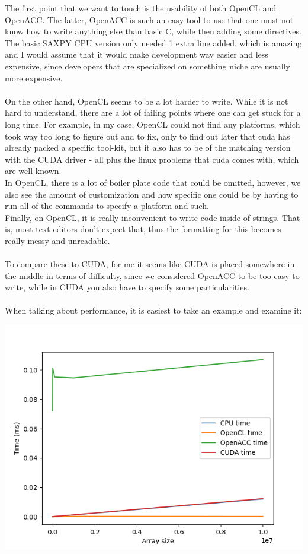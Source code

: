 \documentclass[english]{exam}
\begin{document}
{The first point that we want to touch is the usability of both OpenCL and OpenACC. The latter, OpenACC is such an easy tool to use that one must not know how to write anything else than basic C, while then adding some directives. The basic SAXPY CPU version only needed 1 extra line added, which is amazing and I would assume that it would make development way easier and less expensive, since developers that are specialized on something niche are usually more expensive. \\\\
On the other hand, OpenCL seems to be a lot harder to write. While it is not hard to understand, there are a lot of failing points where one can get stuck for a long time. For example, in my case, OpenCL could not find any platforms, which took way too long to figure out and to fix, only to find out later that cuda has already packed a specific tool-kit, but it also has to be of the matching version with the CUDA driver - all plus the linux problems that cuda comes with, which are well known. \\
In OpenCL, there is a lot of boiler plate code that could be omitted, however, we also see the amount of customization and how specific one could be by having to run all of the commands to specify a platform and such. \\
Finally, on OpenCL, it is really inconvenient to write code inside of strings. That is, most text editors don't expect that, thus the formatting for this becomes really messy and unreadable.
\\\\
To compare these to CUDA, for me it seems like CUDA is placed somewhere in the middle in terms of difficulty, since we considered OpenACC to be too easy to write, while in CUDA you also have to specify some particularities.
\\\\
When talking about performance, it is easiest to take an example and examine it:
  \begin{center}
    \includegraphics[scale=0.6]{plot3.png}

\end{center}}
\end{document}
